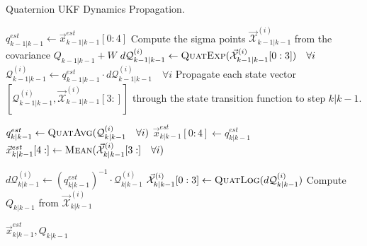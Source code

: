 \documentclass[conference]{IEEEtran}
\begin{document}
\begin{algorithm}
  \caption{Quaternion UKF Dynamics Propagation.}
  \label{alg:propdyn}
  \begin{algorithmic}
      \State $q_{k-1|k-1}^{est} \gets \vec{x}_{k-1|k-1}^{est}[0:4]$
      \State Compute the sigma points $\vec{\mathcal{X}}^{(i)}_{k-1|k-1}$ from the covariance $Q_{k-1|k-1} + W$
      \State $d\mathcal{Q}^{(i)}_{k-1|k-1} \gets \textproc{QuatExp}(\vec{\mathcal{X}}^{(i)}_{k-1|k-1}[0:3]) \quad \forall i$
      \State $\mathcal{Q}^{(i)}_{k-1|k-1} \gets q_{k-1|k-1}^{est} \cdot d\mathcal{Q}^{(i)}_{k-1|k-1} \quad \forall i$
      \State Propagate each state vector $[\mathcal{Q}^{(i)}_{k-1|k-1}, \vec{\mathcal{X}}^{(i)}_{k-1|k-1}[3:]]$ through the state transition function to step $k|k-1$.

      \State $q_{k|k-1}^{est} \gets \textproc{QuatAvg}(\mathcal{Q}^{(i)}_{k|k-1} \quad \forall i)$
      \State $\vec{x}_{k|k-1}^{est}[0:4] \gets q_{k|k-1}^{est}$
      \State $\vec{x}_{k|k-1}^{est}[4:] \gets \textproc{Mean}(\vec{\mathcal{X}}^{(i)}_{k|k-1}[3:] \quad \forall i)$

      \State $d\mathcal{Q}^{(i)}_{k|k-1} \gets (q_{k|k-1}^{est})^{-1} \cdot \mathcal{Q}^{(i)}_{k|k-1}$
      \State $\vec{\mathcal{X}}^{(i)}_{k|k-1}[0:3] \gets \textproc{QuatLog}(d\mathcal{Q}^{(i)}_{k|k-1})$
      \State Compute $Q_{k|k-1}$ from $\vec{\mathcal{X}}^{(i)}_{k|k-1}$

      \Return $\vec{x}_{k|k-1}^{est}, Q_{k|k-1}$
      \EndFunction
  \end{algorithmic}
\end{algorithm}
\end{document}

